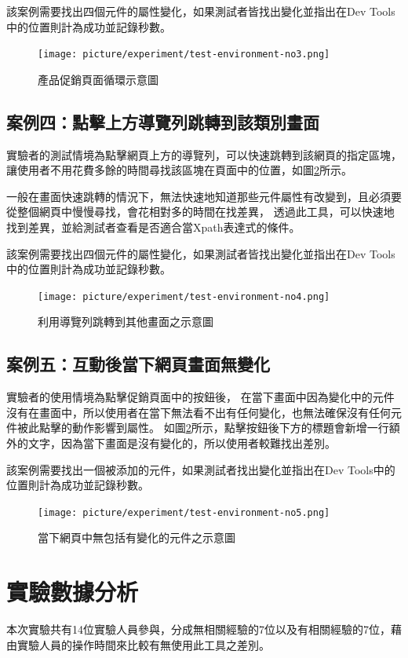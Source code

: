 該案例需要找出四個元件的屬性變化，如果測試者皆找出變化並指出在Dev Tools中的位置則計為成功並記錄秒數。

\begin{figure}[H]
    \centering
    \texttt{[image: picture/experiment/test-environment-no3.png]}
    \caption{產品促銷頁面循環示意圖}
    \label{f4.4}
\end{figure}


\subsection{案例四：點擊上方導覽列跳轉到該類別畫面}\label{s4.2.4}
\indent
實驗者的測試情境為點擊網頁上方的導覽列，可以快速跳轉到該網頁的指定區塊，讓使用者不用花費多餘的時間尋找該區塊在頁面中的位置，如圖\ref{f4.5}所示。

一般在畫面快速跳轉的情況下，無法快速地知道那些元件屬性有改變到，且必須要從整個網頁中慢慢尋找，會花相對多的時間在找差異，
透過此工具，可以快速地找到差異，並給測試者查看是否適合當Xpath表達式的條件。

該案例需要找出四個元件的屬性變化，如果測試者皆找出變化並指出在Dev Tools中的位置則計為成功並記錄秒數。

\begin{figure}[H]
    \centering
    \texttt{[image: picture/experiment/test-environment-no4.png]}
    \caption{利用導覽列跳轉到其他畫面之示意圖}
    \label{f4.5}
\end{figure}

\indent

\subsection{案例五：互動後當下網頁畫面無變化}\label{s4.2.5}
\indent
實驗者的使用情境為點擊促銷頁面中的按鈕後，
在當下畫面中因為變化中的元件沒有在畫面中，所以使用者在當下無法看不出有任何變化，也無法確保沒有任何元件被此點擊的動作影響到屬性。
如圖\ref{f4.5}所示，點擊按鈕後下方的標題會新增一行額外的文字，因為當下畫面是沒有變化的，所以使用者較難找出差別。

該案例需要找出一個被添加的元件，如果測試者找出變化並指出在Dev Tools中的位置則計為成功並記錄秒數。

\begin{figure}[H]
    \centering
    \texttt{[image: picture/experiment/test-environment-no5.png]}
    \caption{當下網頁中無包括有變化的元件之示意圖}
    \label{f4.6}
\end{figure}

\section{實驗數據分析}\label{s4.3}
\indent
本次實驗共有14位實驗人員參與，分成無相關經驗的7位以及有相關經驗的7位，藉由實驗人員的操作時間來比較有無使用此工具之差別。

